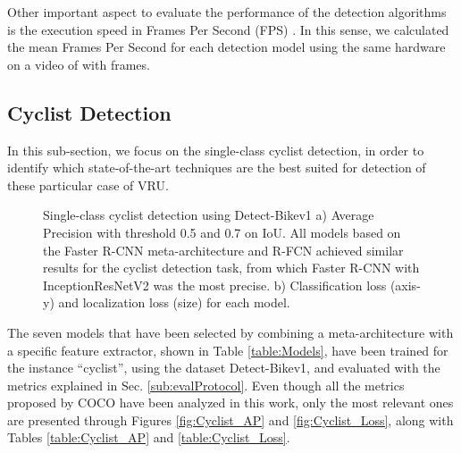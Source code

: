 \documentclass[journal]{IEEEtran}
\begin{document}
Other important aspect to evaluate the performance of the detection algorithms is the execution speed in Frames Per Second (FPS) \cite{liu2020deep}. In this sense, we calculated the mean Frames Per Second for each detection model using the same hardware on a video of  with  frames.

\subsection{Cyclist Detection }
\label{sec:CyclistDetection}

In this sub-section, we focus on the single-class cyclist detection, in order to identify which state-of-the-art techniques are the best suited for detection of these particular case of VRU.

\begin{figure}[t]
\begin{center}
    \newline
    \vspace{-0.3cm}
 \caption{Single-class cyclist detection using Detect-Bikev1 a) Average Precision with threshold 0.5 and 0.7 on IoU. All models based on the Faster R-CNN meta-architecture and R-FCN achieved similar results for the cyclist detection task, from which Faster R-CNN with InceptionResNetV2 was the most precise.  b) Classification loss (axis-y) and localization loss (size) for each model. 
\label{fig:Cyclist_Results}}
\end{center}
\end{figure}

The seven models that have been selected by combining a meta-architecture with a specific feature extractor, shown in Table \ref{table:Models}, have been trained for the instance ``cyclist'', using the dataset Detect-Bikev1, and evaluated with the metrics explained in Sec. \ref{sub:evalProtocol}. Even though all the metrics proposed by COCO \cite{lin2014microsoft} have been analyzed in this work, only the most relevant ones are presented through Figures \ref{fig:Cyclist_AP} and  \ref{fig:Cyclist_Loss}, along with Tables \ref{table:Cyclist_AP} and \ref{table:Cyclist_Loss}.
\end{document}
